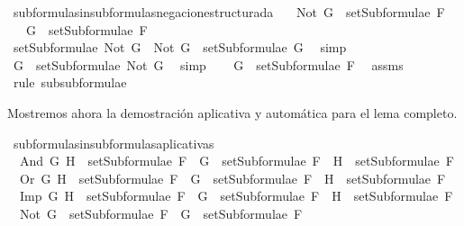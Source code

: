 \begin{isabellebody}
\ subformulas{\isacharunderscore}in{\isacharunderscore}subformulas{\isacharunderscore}negacion{\isacharunderscore}estructurada{\isacharcolon}\isanewline
\ \ \ {\isachardoublequoteopen}Not\ G\ {\isasymin}\ setSubformulae\ F{\isachardoublequoteclose}\isanewline
\ \ \ {\isachardoublequoteopen}G\ {\isasymin}\ setSubformulae\ F{\isachardoublequoteclose}\isanewline
%
\isadelimproof
%
\endisadelimproof
%
\isatagproof
{}\isamarkupfalse%
\ {\isacharminus}\isanewline
\ \ \isamarkupfalse%
\ {\isachardoublequoteopen}setSubformulae\ {\isacharparenleft}Not\ G{\isacharparenright}\ {\isacharequal}\ {\isacharbraceleft}Not\ G{\isacharbraceright}\ {\isasymunion}\ setSubformulae\ G{\isachardoublequoteclose}\ \isamarkupfalse%
\ simp\ \isanewline
\ \ \isamarkupfalse%
\ \isamarkupfalse%
\ {}{\isacharcolon}{\isachardoublequoteopen}G\ {\isasymin}\ setSubformulae\ {\isacharparenleft}Not\ G{\isacharparenright}{\isachardoublequoteclose}\ \isamarkupfalse%
\ simp\isanewline
\ \ \isamarkupfalse%
\ {\isachardoublequoteopen}G\ {\isasymin}\ setSubformulae\ F{\isachardoublequoteclose}\ \isamarkupfalse%
\ assms\ {}\ \isamarkupfalse%
\ {\isacharparenleft}rule\ subsubformulae{\isacharparenright}\isanewline
{}\isamarkupfalse%
%
\endisatagproof
{\isafoldproof}%
%
\isadelimproof
%
\endisadelimproof
%
\begin{isamarkuptext}%
Mostremos ahora la demostración aplicativa y automática para el lema completo.%
\end{isamarkuptext}\isamarkuptrue%
\isamarkupfalse%
\ subformulas{\isacharunderscore}in{\isacharunderscore}subformulas{\isacharunderscore}aplicativa{\isacharunderscore}s{\isacharcolon}\isanewline
\ \ {\isachardoublequoteopen}And\ G\ H\ {\isasymin}\ setSubformulae\ F\ {\isasymLongrightarrow}\ G\ {\isasymin}\ setSubformulae\ F\ {\isasymand}\ H\ {\isasymin}\ setSubformulae\ F{\isachardoublequoteclose}\isanewline
\ \ {\isachardoublequoteopen}Or\ G\ H\ {\isasymin}\ setSubformulae\ F\ {\isasymLongrightarrow}\ G\ {\isasymin}\ setSubformulae\ F\ {\isasymand}\ H\ {\isasymin}\ setSubformulae\ F{\isachardoublequoteclose}\isanewline
\ \ {\isachardoublequoteopen}Imp\ G\ H\ {\isasymin}\ setSubformulae\ F\ {\isasymLongrightarrow}\ G\ {\isasymin}\ setSubformulae\ F\ {\isasymand}\ H\ {\isasymin}\ setSubformulae\ F{\isachardoublequoteclose}\isanewline
\ \ {\isachardoublequoteopen}Not\ G\ {\isasymin}\ setSubformulae\ F\ {\isasymLongrightarrow}\ G\ {\isasymin}\ setSubformulae\ F{\isachardoublequoteclose}\isanewline

\end{isabellebody}
